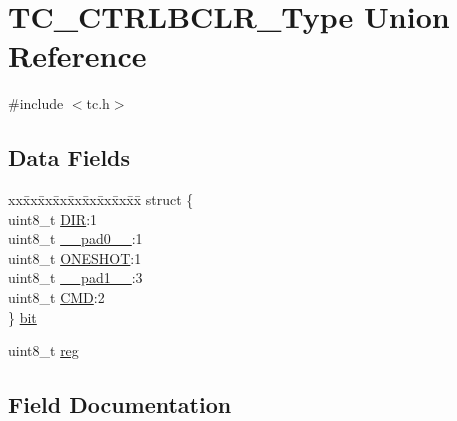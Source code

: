 \hypertarget{union_t_c___c_t_r_l_b_c_l_r___type}{}\section{T\+C\+\_\+\+C\+T\+R\+L\+B\+C\+L\+R\+\_\+\+Type Union Reference}
\label{union_t_c___c_t_r_l_b_c_l_r___type}


{\ttfamily \#include $<$tc.\+h$>$}

\subsection*{Data Fields}
\begin{DoxyCompactItemize}
\item 
\begin{tabbing}
xx\=xx\=xx\=xx\=xx\=xx\=xx\=xx\=xx\=\kill
struct \{\\
\>uint8\_t \mbox{\hyperlink{union_t_c___c_t_r_l_b_c_l_r___type_a58808c7e66b07b82b662e956b63f7e70}{DIR}}:1\\
\>uint8\_t \mbox{\hyperlink{union_t_c___c_t_r_l_b_c_l_r___type_a8b4eebe79ded0459acec2f4950102ba3}{\_\_pad0\_\_}}:1\\
\>uint8\_t \mbox{\hyperlink{union_t_c___c_t_r_l_b_c_l_r___type_a7b9c94dc8f69244e81941bd1c96ca561}{ONESHOT}}:1\\
\>uint8\_t \mbox{\hyperlink{union_t_c___c_t_r_l_b_c_l_r___type_a77f12d2e278bd5c07712648ac0df5e08}{\_\_pad1\_\_}}:3\\
\>uint8\_t \mbox{\hyperlink{union_t_c___c_t_r_l_b_c_l_r___type_a1c855495e78c2efdf239795ed16d8b3e}{CMD}}:2\\
\} \mbox{\hyperlink{union_t_c___c_t_r_l_b_c_l_r___type_a592634a860744abcc03ebd9b29acd4c5}{bit}}\\

\end{tabbing}\item 
uint8\+\_\+t \mbox{\hyperlink{union_t_c___c_t_r_l_b_c_l_r___type_a9428adc9af4653a2050e2536b55dec8d}{reg}}
\end{DoxyCompactItemize}


\subsection{Field Documentation}
\mbox{\label{union_t_c___c_t_r_l_b_c_l_r___type_a8b4eebe79ded0459acec2f4950102ba3}} 
